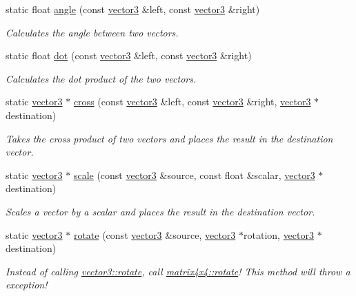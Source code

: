 \begin{DoxyCompactItemize}
static float \hyperlink{classflounder_1_1vector3_a770e2b88cb668db8e2345ece7fd0b55f}{angle} (const \hyperlink{classflounder_1_1vector3}{vector3} \&left, const \hyperlink{classflounder_1_1vector3}{vector3} \&right)
\begin{DoxyCompactList}\small\item\em Calculates the angle between two vectors. \end{DoxyCompactList}\item 
static float \hyperlink{classflounder_1_1vector3_a238394c8800f15754c80a536e4ed2a2a}{dot} (const \hyperlink{classflounder_1_1vector3}{vector3} \&left, const \hyperlink{classflounder_1_1vector3}{vector3} \&right)
\begin{DoxyCompactList}\small\item\em Calculates the dot product of the two vectors. \end{DoxyCompactList}\item 
static \hyperlink{classflounder_1_1vector3}{vector3} $\ast$ \hyperlink{classflounder_1_1vector3_a403643bba81d2b27256223c4437cdca1}{cross} (const \hyperlink{classflounder_1_1vector3}{vector3} \&left, const \hyperlink{classflounder_1_1vector3}{vector3} \&right, \hyperlink{classflounder_1_1vector3}{vector3} $\ast$destination)
\begin{DoxyCompactList}\small\item\em Takes the cross product of two vectors and places the result in the destination vector. \end{DoxyCompactList}\item 
static \hyperlink{classflounder_1_1vector3}{vector3} $\ast$ \hyperlink{classflounder_1_1vector3_a0239e6c1f38120a846cdab87f639cfff}{scale} (const \hyperlink{classflounder_1_1vector3}{vector3} \&source, const float \&scalar, \hyperlink{classflounder_1_1vector3}{vector3} $\ast$destination)
\begin{DoxyCompactList}\small\item\em Scales a vector by a scalar and places the result in the destination vector. \end{DoxyCompactList}\item 
static \hyperlink{classflounder_1_1vector3}{vector3} $\ast$ \hyperlink{classflounder_1_1vector3_aeaa173373adf8f8f870f47d37dea59e0}{rotate} (const \hyperlink{classflounder_1_1vector3}{vector3} \&source, \hyperlink{classflounder_1_1vector3}{vector3} $\ast$rotation, \hyperlink{classflounder_1_1vector3}{vector3} $\ast$destination)
\begin{DoxyCompactList}\small\item\em Instead of calling \hyperlink{classflounder_1_1vector3_aeaa173373adf8f8f870f47d37dea59e0}{vector3\+::rotate}, call \hyperlink{classflounder_1_1matrix4x4_a609091aacfd80ea7ad75dd1c4d14b837}{matrix4x4\+::rotate}! This method will throw a exception! \end{DoxyCompactList}\item 

\end{DoxyCompactItemize}
